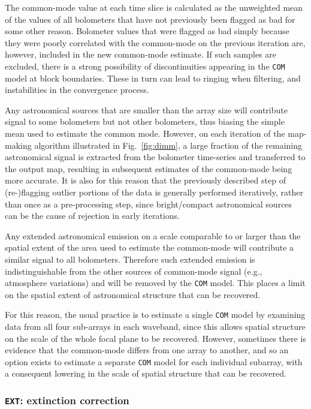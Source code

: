 \documentclass[useAMS,usenatbib,nofootinbib]{mn2e}
\newcommand{\model}[1]{\texttt{#1}}
\begin{document}
The common-mode value at each time slice is calculated as the
unweighted mean of the values of all bolometers that have not
previously been flagged as bad for some other reason. Bolometer values
that were flagged as bad simply because they were poorly correlated
with the common-mode on the previous iteration are, however, included
in the new common-mode estimate. If such samples are excluded, there
is a strong possibility of discontinuities appearing in the
\model{COM} model at block boundaries.  These in turn can lead to
ringing when filtering, and instabilities in the convergence
process.

Any astronomical sources that are smaller than the array size will
contribute signal to some bolometers but not other bolometers, thus
biasing the simple mean used to estimate the common mode. However, on
each iteration of the map-making algorithm illustrated in
Fig.~\ref{fig:dimm}, a large fraction of the remaining astronomical
signal is extracted from the bolometer time-series and transferred to
the output map, resulting in subsequent estimates of the common-mode
being more accurate. It is also for this reason that the previously
described step of (re-)flagging outlier portions of the data is
generally performed iteratively, rather than once as a pre-processing
step, since bright/compact astronomical sources can be the cause of
rejection in early iterations.


Any extended astronomical emission on a scale comparable to or larger
than the spatial extent of the area used to estimate the common-mode
will contribute a similar signal to all bolometers. Therefore such
extended emission is indistinguishable from the other sources of
common-mode signal (e.g., atmosphere variations) and will be removed
by the \model{COM} model. This places a limit on the spatial extent of
astronomical structure that can be recovered.

For this reason, the usual practice is to estimate a single
\model{COM} model by examining data from all four sub-arrays in each
waveband, since this allows spatial structure on the scale of the
whole focal plane to be recovered. However, sometimes there is
evidence that the common-mode differs from one array to another, and
so an option exists to estimate a separate \model{COM} model for each
individual subarray, with a consequent lowering in the scale of
spatial structure that can be recovered.

\subsubsection{\model{EXT}: extinction correction}
\label{sec:ext}
\end{document}

